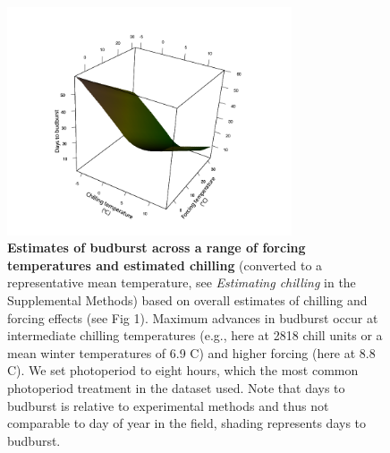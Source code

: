 \documentclass{article}
\begin{document}
\begin{figure}[h!]
\centering
\noindent \includegraphics[width=0.75\textwidth]{..//..//analyses/bb_analysis/figures/bbmod_3dplot_utah_withPEP.png}
\caption{\textbf{Estimates of budburst across a range of forcing temperatures and estimated chilling} (converted to a representative mean temperature, see \emph{Estimating chilling} in the Supplemental Methods) based on overall estimates of chilling and forcing effects (see Fig 1). Maximum advances in budburst occur at intermediate chilling temperatures (e.g., here at 2818 chill units or a mean winter temperatures of 6.9 \degree C) and higher forcing (here at 8.8 \degree C).  We set photoperiod to eight hours, which the most common photoperiod treatment in the dataset used. Note that days to budburst is relative to experimental methods and thus not comparable to day of year in the field, shading represents days to budburst.} %
\label{fig:apc}
\end{figure}
\newpage
\end{document}
